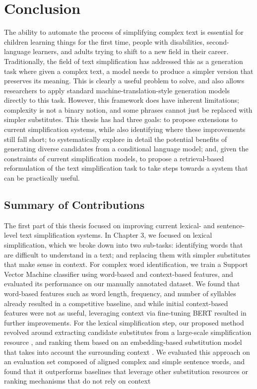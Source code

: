 \documentclass[thesis.tex]{subfiles}
\begin{document}
\chapter{Conclusion}

The ability to automate the process of simplifying complex text is essential for children learning things for the first time, people with disabilities, second-language learners, and adults trying to shift to a new field in their career. Traditionally, the field of text simplification has addressed this as a generation task where given a complex text, a model needs to produce a simpler version that preserves its meaning. This is clearly a useful problem to solve, and also allows researchers to apply standard machine-translation-style generation models directly to this task. However, this framework does have inherent limitations; complexity is not a binary notion, and some phrases cannot just be replaced with simpler substitutes. This thesis has had three goals: to propose extensions to current simplification systems, while also identifying where these improvements still fall short; to systematically explore in detail the potential benefits of generating diverse candidates from a conditional language model; and, given the constraints of current simplification models, to propose a retrieval-based reformulation of the text simplification task to take steps towards a system that can be practically useful.

\section{Summary of Contributions}

The first part of this thesis focused on improving current lexical- and sentence-level text simplification systems. In Chapter 3, we focused on lexical simplification, which we broke down into two sub-tasks: identifying words that are difficult to understand in a text; and replacing them with simpler substitutes that make sense in context. For complex word identification, we train a Support Vector Machine classifier using word-based and context-based features, and evaluated its performance on our manually annotated dataset. We found that word-based features such as word length, frequency, and number of syllables already resulted in a competitive baseline, and while initial context-based features were not as useful, leveraging context via fine-tuning BERT resulted in further improvements. For the lexical simplification step, our proposed method revolved around extracting candidate substitutes from a large-scale simplification resource \citep{pavlick2016simple}, and ranking them based on an embedding-based substitution model that takes into account the surrounding context \citep{melamud2015simple}. We evaluated this approach on an evaluation set composed of aligned complex and simple sentence words, and found that it outperforms baselines that leverage other substitution resources or ranking mechanisms that do not rely on context
\end{document}

